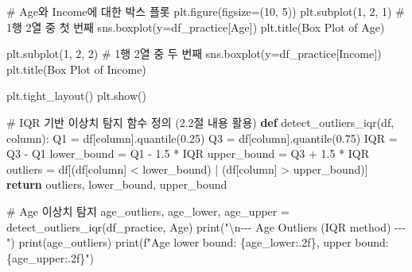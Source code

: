 \documentclass[
  letterpaper,
]{book}
\newenvironment{Shaded}{\begin{snugshade}}{\end{snugshade}}
\newcommand{\BuiltInTok}[1]{\textcolor[rgb]{0.00,0.23,0.31}{#1}}
\newcommand{\CharTok}[1]{\textcolor[rgb]{0.13,0.47,0.30}{#1}}
\newcommand{\CommentTok}[1]{\textcolor[rgb]{0.37,0.37,0.37}{#1}}
\newcommand{\ControlFlowTok}[1]{\textcolor[rgb]{0.00,0.23,0.31}{\textbf{#1}}}
\newcommand{\DecValTok}[1]{\textcolor[rgb]{0.68,0.00,0.00}{#1}}
\newcommand{\FloatTok}[1]{\textcolor[rgb]{0.68,0.00,0.00}{#1}}
\newcommand{\KeywordTok}[1]{\textcolor[rgb]{0.00,0.23,0.31}{\textbf{#1}}}
\newcommand{\NormalTok}[1]{\textcolor[rgb]{0.00,0.23,0.31}{#1}}
\newcommand{\OperatorTok}[1]{\textcolor[rgb]{0.37,0.37,0.37}{#1}}
\newcommand{\SpecialCharTok}[1]{\textcolor[rgb]{0.37,0.37,0.37}{#1}}
\newcommand{\SpecialStringTok}[1]{\textcolor[rgb]{0.13,0.47,0.30}{#1}}
\newcommand{\StringTok}[1]{\textcolor[rgb]{0.13,0.47,0.30}{#1}}
\begin{document}
\begin{Shaded}
\begin{Highlighting}[]
\CommentTok{\# Age와 Income에 대한 박스 플롯}
\NormalTok{plt.figure(figsize}\OperatorTok{=}\NormalTok{(}\DecValTok{10}\NormalTok{, }\DecValTok{5}\NormalTok{))}
\NormalTok{plt.subplot(}\DecValTok{1}\NormalTok{, }\DecValTok{2}\NormalTok{, }\DecValTok{1}\NormalTok{) }\CommentTok{\# 1행 2열 중 첫 번째}
\NormalTok{sns.boxplot(y}\OperatorTok{=}\NormalTok{df\_practice[}\StringTok{\textquotesingle{}Age\textquotesingle{}}\NormalTok{])}
\NormalTok{plt.title(}\StringTok{\textquotesingle{}Box Plot of Age\textquotesingle{}}\NormalTok{)}

\NormalTok{plt.subplot(}\DecValTok{1}\NormalTok{, }\DecValTok{2}\NormalTok{, }\DecValTok{2}\NormalTok{) }\CommentTok{\# 1행 2열 중 두 번째}
\NormalTok{sns.boxplot(y}\OperatorTok{=}\NormalTok{df\_practice[}\StringTok{\textquotesingle{}Income\textquotesingle{}}\NormalTok{])}
\NormalTok{plt.title(}\StringTok{\textquotesingle{}Box Plot of Income\textquotesingle{}}\NormalTok{)}

\NormalTok{plt.tight\_layout()}
\NormalTok{plt.show()}

\CommentTok{\# IQR 기반 이상치 탐지 함수 정의 (2.2절 내용 활용)}
\KeywordTok{def}\NormalTok{ detect\_outliers\_iqr(df, column):}
\NormalTok{    Q1 }\OperatorTok{=}\NormalTok{ df[column].quantile(}\FloatTok{0.25}\NormalTok{)}
\NormalTok{    Q3 }\OperatorTok{=}\NormalTok{ df[column].quantile(}\FloatTok{0.75}\NormalTok{)}
\NormalTok{    IQR }\OperatorTok{=}\NormalTok{ Q3 }\OperatorTok{{-}}\NormalTok{ Q1}
\NormalTok{    lower\_bound }\OperatorTok{=}\NormalTok{ Q1 }\OperatorTok{{-}} \FloatTok{1.5} \OperatorTok{*}\NormalTok{ IQR}
\NormalTok{    upper\_bound }\OperatorTok{=}\NormalTok{ Q3 }\OperatorTok{+} \FloatTok{1.5} \OperatorTok{*}\NormalTok{ IQR}
\NormalTok{    outliers }\OperatorTok{=}\NormalTok{ df[(df[column] }\OperatorTok{\textless{}}\NormalTok{ lower\_bound) }\OperatorTok{|}\NormalTok{ (df[column] }\OperatorTok{\textgreater{}}\NormalTok{ upper\_bound)]}
    \ControlFlowTok{return}\NormalTok{ outliers, lower\_bound, upper\_bound}

\CommentTok{\# Age 이상치 탐지}
\NormalTok{age\_outliers, age\_lower, age\_upper }\OperatorTok{=}\NormalTok{ detect\_outliers\_iqr(df\_practice, }\StringTok{\textquotesingle{}Age\textquotesingle{}}\NormalTok{)}
\BuiltInTok{print}\NormalTok{(}\StringTok{"}\CharTok{\textbackslash{}n}\StringTok{{-}{-}{-} Age Outliers (IQR method) {-}{-}{-}"}\NormalTok{)}
\BuiltInTok{print}\NormalTok{(age\_outliers)}
\BuiltInTok{print}\NormalTok{(}\SpecialStringTok{f"Age lower bound: }\SpecialCharTok{\{}\NormalTok{age\_lower}\SpecialCharTok{:.2f\}}\SpecialStringTok{, upper bound: }\SpecialCharTok{\{}\NormalTok{age\_upper}\SpecialCharTok{:.2f\}}\SpecialStringTok{"}\NormalTok{)}


\end{Highlighting}
\end{Shaded}
\end{document}
